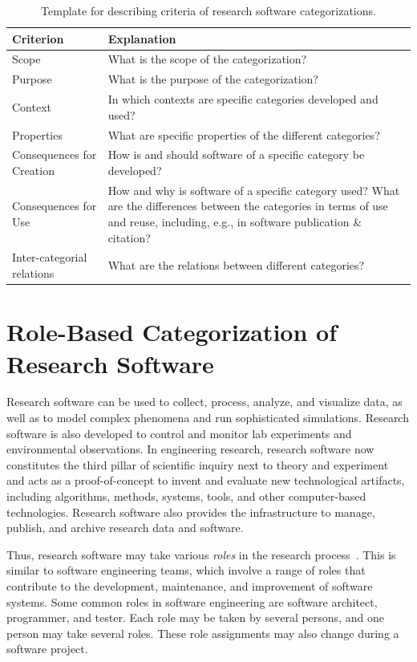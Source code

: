 \documentclass{IEEEcsmag}
\begin{document}
\begin{table}[bht]
    \centering
    \begin{tabularx}{\textwidth}{l X}
    \toprule
        Criterion & Explanation \\
    \midrule
        Scope & What is the scope of the categorization? \\
        Purpose & What is the purpose of the categorization? \\
        Context &  In which contexts are specific categories developed and used? \\
        Properties & What are specific properties of the different categories? \\
        Consequences for Creation & How is and should software of a specific category be developed? \\
        Consequences for Use & How and why is software of a specific category used? What are the differences between the categories in terms of use and reuse, including, e.g., in software publication \& citation? \\
        Inter-categorial relations & What are the relations between different categories?\\
    \bottomrule
    \end{tabularx}
    \caption{Template for describing criteria of research software categorizations.}
    \label{table:categorization-criteria}
\end{table}

\section{Role-Based Categorization of Research Software}

Research software can be used to collect, process, analyze, and visualize data, as well as to model complex phenomena and run sophisticated simulations. Research software is also developed to control and monitor lab experiments and environmental observations. In engineering research, research software now constitutes the third pillar of scientific inquiry next to theory and experiment~\cite{Reed2005} and acts as a proof-of-concept to invent and evaluate new technological artifacts, including algorithms, methods, systems, tools, and other computer-based technologies. Research software also provides the infrastructure to manage, publish, and archive research data and software. 

Thus, research software may take various \emph{roles} in the research process~\cite{NieuwpoortKatz2023}.
This is similar to software engineering teams, which involve a range of roles that contribute to the development, maintenance, and improvement of software systems. Some common roles in software engineering are software architect, programmer, and tester. Each role may be taken by several persons, and one person may take several roles. These role assignments may also change during a software project. 
\end{document}
